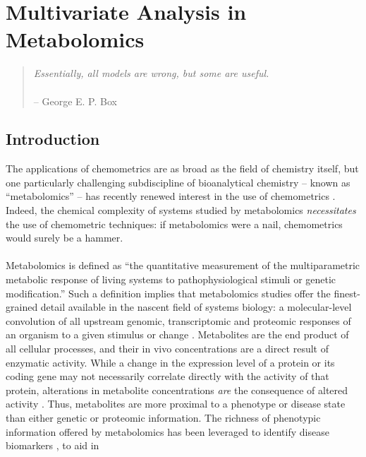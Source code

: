 
\chapter{Multivariate Analysis in Metabolomics}

\begin{quote}
{\it Essentially, all models are wrong, but some are useful.}
\\\\
 -- George E. P. Box
\end{quote}

\section{Introduction}

\begin{doublespace}
The applications of chemometrics are as broad as the field of chemistry itself,
but one particularly challenging subdiscipline of bioanalytical chemistry --
known as ``metabolomics'' -- has recently renewed interest in the use of
chemometrics \cite{worley:cmb2013}. Indeed, the chemical complexity of
systems studied by metabolomics {\it necessitates} the use of chemometric
techniques: if metabolomics were a nail, chemometrics would surely be a hammer.
\\\\
Metabolomics is defined \cite{lindon:cmr2000} as ``the quantitative
measurement of the multiparametric metabolic response of living systems to
pathophysiological stimuli or genetic modification.'' Such a definition implies
that metabolomics studies offer the finest-grained detail available in the
nascent field of systems biology: a molecular-level convolution of all upstream
genomic, transcriptomic and proteomic responses of an organism to a given
stimulus or change
\cite{kell:opin2004,trethewey:opin2001,weckwerth:arpb2003}. Metabolites
are the end product of all cellular processes, and their in vivo
concentrations are a direct result of enzymatic activity. While a change in the
expression level of a protein or its coding gene may not necessarily correlate
directly with the activity of that protein, alterations in metabolite
concentrations {\it are} the consequence of altered activity
\cite{terkuile:febs2001}. Thus, metabolites are more proximal to a
phenotype or disease state than either genetic or proteomic information. The
richness of phenotypic information offered by metabolomics has been leveraged
to identify disease biomarkers
\cite{gebregiworgis:cchts2012,vinayavekhin:acscb2010}, to aid in

\end{doublespace}
